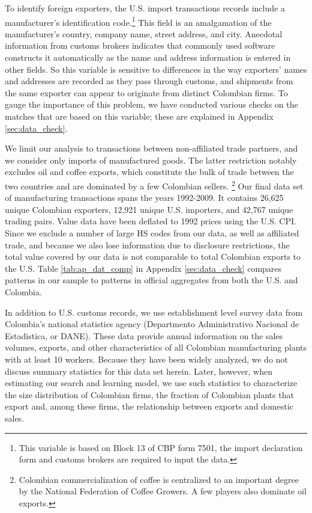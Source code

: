 \documentclass[12pt]{article}
\begin{document}
To identify foreign exporters, the U.S. import transactions records include
a manufacturer's identification code.\footnote{%
This variable is based on Block 13 of CBP form 7501, the import declaration
form and customs brokers are required to input the data.\medskip} This field is an
amalgamation of the manufacturer's country, company name, street address,
and city. Anecdotal information from customs brokers indicates that commonly
used software constructs it automatically as the name and address
information is entered in other fields. So this variable is sensitive to
differences in the way exporters' names and addresses are recorded as they
pass through customs, and shipments from the same exporter can appear to
originate from distinct Colombian firms. To gauge the importance of this
problem, we have conducted various checks on the matches that are based on
this variable; these are explained in Appendix \ref{sec:data_check}.

We limit our analysis to transactions between non-affiliated trade partners,
and we consider only imports of manufactured goods. The latter restriction
notably excludes oil and coffee exports, which constitute the bulk of trade
between the two countries and are dominated by a few Colombian sellers.%
\footnote{%
Colombian commercialization of coffee is centralized to an important degree
by the National Federation of Coffee Growers. A few players also dominate
oil exports.\medskip} Our final data set of manufacturing transactions spans the
years 1992-2009. It contains 26,625 unique Colombian exporters, 12,921
unique U.S. importers, and 42,767 unique trading pairs. Value data have been
deflated to 1992 prices using the U.S. CPI. Since we exclude a number of
large HS codes from our data, as well as affiliated trade, and because we
also lose information due to disclosure restrictions, the total value
covered by our data is not comparable to total Colombian exports to the U.S.
Table \ref{tab:ap_dat_comp} in Appendix \ref{sec:data_check} compares
patterns in our sample to patterns in official aggregates from both the U.S.
and Colombia.

In addition to U.S. customs records, we use establishment level survey data
from Colombia's national statistics agency (Departmento Administrativo
Nacional de Estadistica, or DANE). These data provide annual information on
the sales volumes, exports, and other characteristics of all Colombian
manufacturing plants with at least 10 workers. Because they have been widely
analyzed, we do not discuss summary statistics for this data set herein.
Later, however, when estimating our search and learning model, we use such
statistics to characterize the size distribution of Colombian firms, the
fraction of Colombian plants that export and, among these firms, the
relationship between exports and domestic sales.
\end{document}
